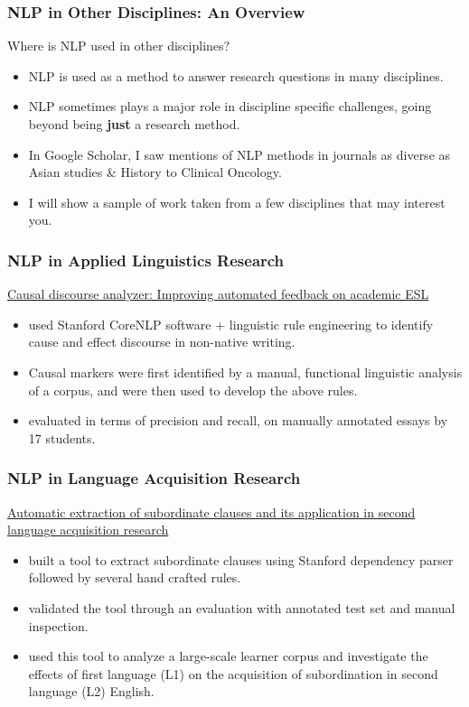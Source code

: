 \documentclass{beamer}
\begin{document}
\begin{frame}
\frametitle{NLP in Other Disciplines: An Overview}
Where is NLP used in other disciplines?
\begin{itemize}
\item NLP is used as a method to answer research questions in many disciplines. 
\item NLP sometimes plays a major role in discipline specific challenges, going beyond being \textbf{just} a research method. 
\item In Google Scholar, I saw mentions of NLP methods in journals as diverse as Asian studies \& History to Clinical Oncology.
\item I will show a sample of work taken from a few disciplines that may interest you.
\end{itemize}
\end{frame}

\begin{frame}
\frametitle{NLP in Applied Linguistics Research}
\href{(https://www.tandfonline.com/doi/full/10.1080/09588221.2014.991795}{Causal discourse analyzer: Improving automated feedback on academic ESL}
\begin{itemize}
\item used Stanford CoreNLP software + linguistic rule engineering to identify cause and effect discourse in non-native writing.
\item Causal markers were first identified by a manual, functional linguistic analysis of a corpus, and were then used to develop the above rules.  
\item evaluated in terms of precision and recall, on manually annotated essays by 17 students. 
\end{itemize}
\end{frame}

\begin{frame}
\frametitle{NLP in Language Acquisition Research}
\href{(https://link.springer.com/article/10.3758/s13428-020-01456-7\#Sec3}{Automatic extraction of subordinate clauses and its application in second language acquisition research}
\begin{itemize}
\item built a tool to extract subordinate clauses using Stanford dependency parser followed by several hand crafted rules.
\item validated the tool through an evaluation with annotated test set and manual inspection.  
\item used this tool to analyze a large-scale learner corpus and investigate the effects of first language (L1) on the acquisition of subordination in second language (L2) English.
\end{itemize}
\end{frame}
\end{document}

